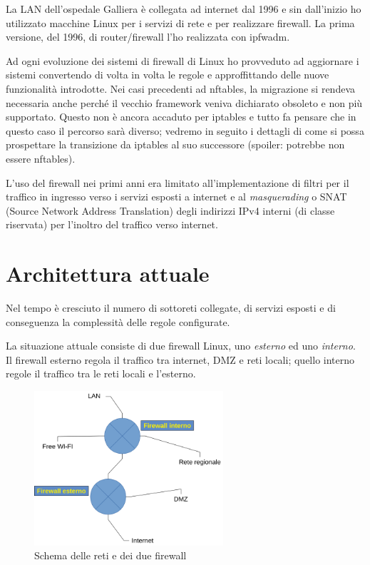 La LAN dell'ospedale Galliera è collegata ad internet dal 1996 e sin
dall'inizio ho utilizzato macchine Linux per i servizi di rete e per
realizzare firewall.  La prima versione, del 1996, di router/firewall l'ho
realizzata con ipfwadm.

Ad ogni evoluzione dei sistemi di firewall di Linux ho provveduto ad
aggiornare i sistemi convertendo di volta in volta le regole e approffittando
delle nuove funzionalità introdotte.  Nei casi precedenti ad nftables, la
migrazione si rendeva necessaria anche perché il vecchio framework veniva
dichiarato obsoleto e non più supportato.  Questo non è ancora accaduto per
iptables e tutto fa pensare che in questo caso il percorso sarà diverso;
vedremo in seguito i dettagli di come si possa prospettare la transizione da
iptables al suo successore (spoiler: potrebbe non essere nftables).

L'uso del firewall nei primi anni era limitato all'implementazione di filtri
per il traffico in ingresso verso i servizi esposti a internet e al {\em
masquerading} o SNAT (Source Network Address Translation) degli indirizzi IPv4
interni (di classe riservata) per l'inoltro del traffico verso internet.

\section{Architettura attuale}

Nel tempo è cresciuto il numero di sottoreti collegate, di servizi esposti e
di conseguenza la complessità delle regole configurate.

La situazione attuale consiste di due firewall Linux, uno {\em esterno} ed uno
{\em interno}.  Il firewall esterno regola il traffico tra internet, DMZ e
reti locali; quello interno regole il traffico tra le reti locali e l'esterno.

\begin{figure}
\begin{center}
	  \includegraphics[width=7cm]{rete.png}
	  \caption{Schema delle reti e dei due firewall}
	  \label{fig:rete}
\end{center}
\end{figure}

